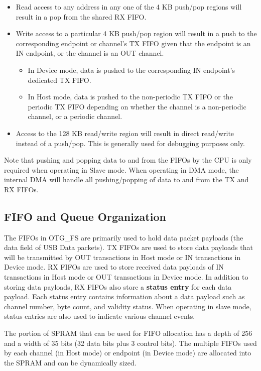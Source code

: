 \documentclass[main\_\_EN.tex]{subfiles}
\begin{document}
\begin{itemize}
    \item Read access to any address in any one of the 4 KB push/pop regions will result in a pop from the shared RX FIFO.
    \item Write access to a particular 4 KB push/pop region will result in a push to the corresponding endpoint or channel's TX FIFO given that the endpoint is an IN endpoint, or the channel is an OUT channel.
    \begin{itemize}
        \item In Device mode, data is pushed to the corresponding IN endpoint's dedicated TX FIFO.
        \item In Host mode, data is pushed to the non-periodic TX FIFO or the periodic TX FIFO depending on whether the channel is a non-periodic channel, or a periodic channel.
    \end{itemize}
    \item Access to the 128 KB read/write region will result in direct read/write instead of a push/pop. This is generally used for debugging purposes only.
\end{itemize}

Note that pushing and popping data to and from the FIFOs by the CPU is only required when operating in Slave mode. When operating in DMA mode, the internal DMA will handle all pushing/popping of data to and from the TX and RX FIFOs.

\subsection{FIFO and Queue Organization}
\label{sec:usbotg-fifo-queue-orga}

The FIFOs in OTG\_FS are primarily used to hold data packet payloads (the data field of USB Data packets). TX FIFOs are used to store data payloads that will be transmitted by OUT transactions in Host mode or IN transactions in Device mode. RX FIFOs are used to store received data payloads of IN transactions in Host mode or OUT transactions in Device mode. In addition to storing data payloads, RX FIFOs also store a \textbf{status entry} for each data payload. Each status entry contains information about a data payload such as channel number, byte count, and validity status. When operating in slave mode, status entries are also used to indicate various channel events.

The portion of SPRAM that can be used for FIFO allocation has a depth of 256 and a width of 35 bits (32 data bits plus 3 control bits). The multiple FIFOs used by each channel (in Host mode) or endpoint (in Device mode) are allocated into the SPRAM and can be dynamically sized.
\end{document}
